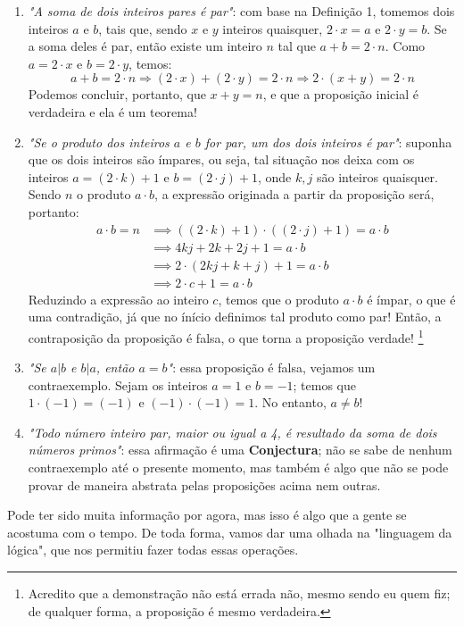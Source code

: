 \documentclass[13pt,letterpaper]{article}
\begin{document}
\begin{enumerate}
    \item \emph{"A soma de dois inteiros pares é par"}: com base na Definição 1, tomemos dois inteiros $a$ e $b$, tais que, sendo $x$ e $y$ inteiros quaisquer, $2 \cdot x = a$ e $2 \cdot y = b$. Se a soma deles é par, então existe um inteiro $n$ tal que $a + b = 2 \cdot n$. Como $a = 2 \cdot x$ e $b = 2 \cdot y$, temos:
    \begin{equation}
        a + b = 2 \cdot n
        \Longrightarrow (2 \cdot x) + (2 \cdot y) = 2 \cdot n
        \Longrightarrow 2 \cdot (x + y) = 2 \cdot n
    \end{equation}
    Podemos concluir, portanto, que $x + y = n$, e que a proposição inicial é verdadeira e ela é um teorema! 
    \item \emph{"Se o produto dos inteiros $a$ e $b$ for par, um dos dois inteiros é par"}: suponha que os dois inteiros são ímpares, ou seja, tal situação nos deixa com os inteiros $a = (2 \cdot k) + 1$ e $b = (2 \cdot j) + 1$, onde $k, j$ são inteiros quaisquer.
    Sendo $n$ o produto $a \cdot b$, a expressão originada a partir da proposição será, portanto:
        \begin{align*}
        a \cdot b = n &\implies 
        ((2 \cdot k) + 1) \cdot ((2 \cdot j) + 1) = a \cdot b \\ &\implies 
        4kj + 2k + 2j + 1 = a \cdot b \\ &\implies
        2 \cdot (2kj + k + j) + 1 = a \cdot b \\ &\implies
        2 \cdot c + 1 = a \cdot b
        \end{align*}
    Reduzindo a expressão ao inteiro $c$, temos que o produto $a \cdot b$ é ímpar, o que é uma contradição, já que no ínício definimos tal produto como par! Então, a contraposição da proposição é falsa, o que torna a proposição verdade!
    \footnote{Acredito que a demonstração não está errada não, mesmo sendo eu quem fiz; de qualquer forma, a proposição é mesmo verdadeira.}
    \item \emph{"Se $a|b$ e $b|a$, então $a = b$"}: essa proposição é falsa, vejamos um contraexemplo. Sejam os inteiros $a = 1$ e $b = -1$; temos que $ 1 \cdot (-1) = (-1)$ e $(-1) \cdot (-1) = 1$. No entanto, $a \ne b$!
    \item \emph{"Todo número inteiro par, maior ou igual a 4, é resultado da soma de dois números primos"}: essa afirmação é uma \textbf{Conjectura}; não se sabe de nenhum contraexemplo até o presente momento, mas também é algo que não se pode provar de maneira abstrata pelas proposições acima nem outras.
\end{enumerate}
Pode ter sido muita informação por agora, mas isso é algo que a gente se acostuma com o tempo. De toda forma, vamos dar uma olhada na "linguagem da lógica", que nos permitiu fazer todas essas operações.
\end{document}
